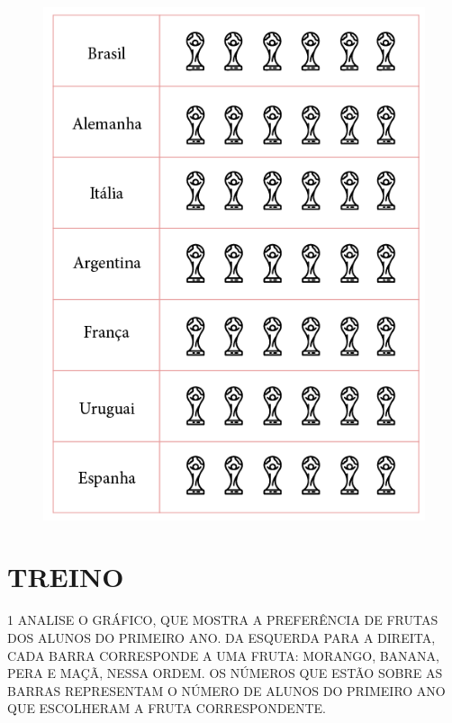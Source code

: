 \pagebreak

\vspace{1cm}

\begin{figure}[H]
\centering
\includegraphics[width=\textwidth]{./media/SAEB_1ANO_MAT_FIGURA108.png}
\end{figure}

\section*{TREINO}

\num{1} ANALISE O GRÁFICO, QUE MOSTRA A 
PREFERÊNCIA DE FRUTAS DOS ALUNOS DO PRIMEIRO 
ANO. DA ESQUERDA PARA A DIREITA, CADA BARRA 
CORRESPONDE A UMA FRUTA: MORANGO, BANANA, PERA 
E MAÇÃ, NESSA ORDEM. OS NÚMEROS QUE ESTÃO 
SOBRE AS BARRAS REPRESENTAM O NÚMERO DE ALUNOS 
DO PRIMEIRO ANO QUE ESCOLHERAM A FRUTA 
CORRESPONDENTE.

